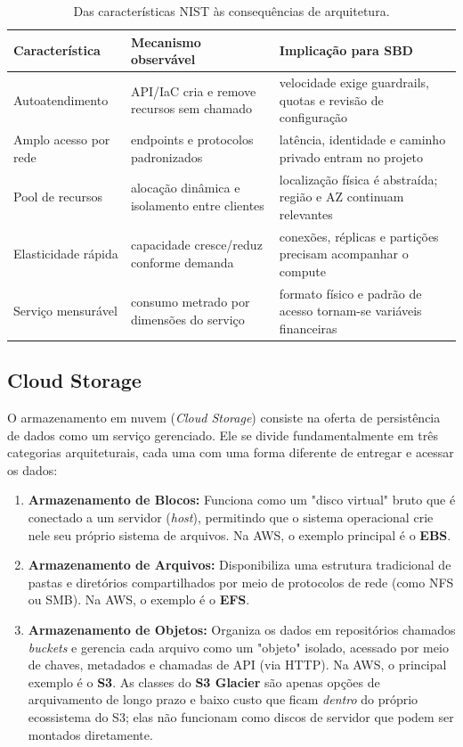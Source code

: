\documentclass[11pt,a4paper]{article}
\begin{document}
\begin{table}[H]\centering\caption{Das características NIST às consequências de arquitetura.}
\small\begin{tabularx}{\textwidth}{@{}p{3.1cm}Y Y@{}}\toprule
\textbf{Característica} & \textbf{Mecanismo observável} & \textbf{Implicação para SBD}\\\midrule
Autoatendimento & API/IaC cria e remove recursos sem chamado & velocidade exige guardrails, quotas e revisão de configuração\\
Amplo acesso por rede & endpoints e protocolos padronizados & latência, identidade e caminho privado entram no projeto\\
Pool de recursos & alocação dinâmica e isolamento entre clientes & localização física é abstraída; região e AZ continuam relevantes\\
Elasticidade rápida & capacidade cresce/reduz conforme demanda & conexões, réplicas e partições precisam acompanhar o compute\\
Serviço mensurável & consumo metrado por dimensões do serviço & formato físico e padrão de acesso tornam-se variáveis financeiras\\\bottomrule
\end{tabularx}\end{table}

\subsection{Cloud Storage}
O armazenamento em nuvem (\emph{Cloud Storage}) consiste na oferta de persistência de dados como um serviço gerenciado. Ele se divide fundamentalmente em três categorias arquiteturais, cada uma com uma forma diferente de entregar e acessar os dados:

\begin{enumerate}
    \item \textbf{Armazenamento de Blocos:} Funciona como um "disco virtual" bruto que é conectado a um servidor (\emph{host}), permitindo que o sistema operacional crie nele seu próprio sistema de arquivos. Na AWS, o exemplo principal é o \textbf{EBS}.
    \item \textbf{Armazenamento de Arquivos:} Disponibiliza uma estrutura tradicional de pastas e diretórios compartilhados por meio de protocolos de rede (como NFS ou SMB). Na AWS, o exemplo é o \textbf{EFS}.
    \item \textbf{Armazenamento de Objetos:} Organiza os dados em repositórios chamados \emph{buckets} e gerencia cada arquivo como um "objeto" isolado, acessado por meio de chaves, metadados e chamadas de API (via HTTP). Na AWS, o principal exemplo é o \textbf{S3}. As classes do \textbf{S3 Glacier} são apenas opções de arquivamento de longo prazo e baixo custo que ficam \emph{dentro} do próprio ecossistema do S3; elas não funcionam como discos de servidor que podem ser montados diretamente.
\end{enumerate}
\end{document}
